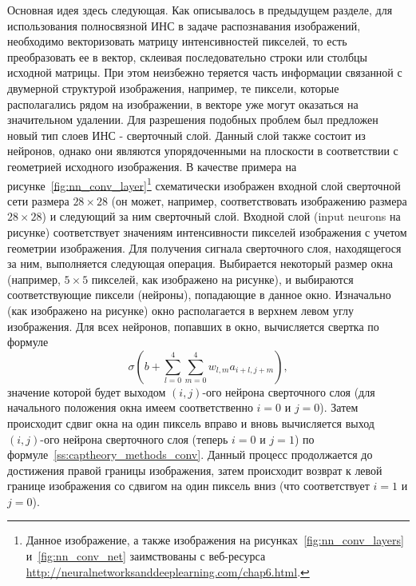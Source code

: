 \documentclass[a4paper,12pt,russian]{article} %
\begin{document}
Основная идея здесь следующая.
Как описывалось в предыдущем разделе, для использования полносвязной ИНС в задаче распознавания изображений, необходимо векторизовать матрицу интенсивностей пикселей, то есть преобразовать ее в вектор, склеивая последовательно строки или столбцы исходной матрицы.
При этом неизбежно теряется часть информации связанной с двумерной структурой изображения, например, те пиксели, которые располагались рядом на изображении, в векторе уже могут оказаться на значительном удалении.
Для разрешения подобных проблем был предложен новый тип слоев ИНС - сверточный слой.
Данный слой также состоит из нейронов, однако они являются упорядоченными на плоскости в соответствии с геометрией исходного изображения.
В качестве примера на рисунке~\ref{fig:nn_conv_layer}\footnote{
	Данное изображение, а также изображения на рисунках~\ref{fig:nn_conv_layers} и~\ref{fig:nn_conv_net} заимствованы с веб-ресурса \url{http://neuralnetworksanddeeplearning.com/chap6.html}.
}
схематически изображен входной слой сверточной сети размера $28 \times 28$ (он может, например, соответствовать изображению размера $28 \times 28$) и следующий за ним сверточный слой.
Входной слой (input neurons на рисунке) соответствует значениям интенсивности пикселей изображения с учетом геометрии изображения.
Для получения сигнала сверточного слоя, находящегося за ним, выполняется следующая операция.
Выбирается некоторый размер окна (например, $5 \times 5$ пикселей, как изображено на рисунке), и выбираются соответствующие пиксели (нейроны), попадающие в данное окно.
Изначально (как изображено на рисунке) окно располагается в верхнем левом углу изображения.
Для всех нейронов, попавших в окно, вычисляется свертка по формуле
\begin{equation} \label{ss:captheory_methods_conv}
	\sigma 
		\left(
			b + \sum_{l=0}^{4} \sum_{m=0}^{4} w_{l,m} a_{i+l,j+m}
		\right),
\end{equation}
значение которой будет выходом $(i,j)$-ого нейрона сверточного слоя (для начального положения окна имеем соответственно $i=0$ и $j=0$).
Затем происходит сдвиг окна на один пиксель вправо и вновь вычисляется выход $(i,j)$-ого нейрона сверточного слоя (теперь $i=0$ и $j=1$) по формуле~\eqref{ss:captheory_methods_conv}.
Данный процесс продолжается до достижения правой границы изображения, затем происходит возврат к левой границе изображения со сдвигом на один пиксель вниз (что соответствует $i=1$ и $j=0$).
\end{document}
